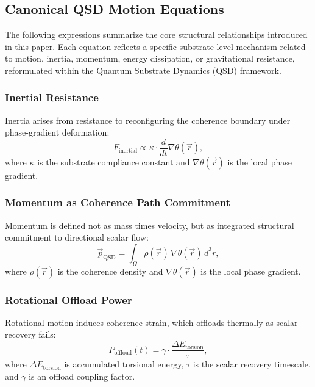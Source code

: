 \documentclass[entropy,article,submit,pdftex,moreauthors]{Definitions/mdpi}
\begin{document}
\appendixstart
\appendix
\section[\appendixname~\thesection]{}
\subsection[\appendixname~\thesubsection]{Canonical QSD Motion Equations}

The following expressions summarize the core structural relationships introduced in this paper. Each equation reflects a specific substrate-level mechanism related to motion, inertia, momentum, energy dissipation, or gravitational resistance, reformulated within the Quantum Substrate Dynamics (QSD) framework.

\subsubsection{Inertial Resistance}
Inertia arises from resistance to reconfiguring the coherence boundary under phase-gradient deformation:
\begin{equation}
    F_{\text{inertial}} \propto \kappa \cdot \frac{d}{dt} \nabla \theta(\vec{r}),
\end{equation}
where \( \kappa \) is the substrate compliance constant and \( \nabla \theta(\vec{r}) \) is the local phase gradient.

\subsubsection{Momentum as Coherence Path Commitment}
Momentum is defined not as mass times velocity, but as integrated structural commitment to directional scalar flow:
\begin{equation}
    \vec{p}_{\text{QSD}} = \int_{\Omega} \rho(\vec{r}) \, \nabla \theta(\vec{r}) \, d^3r,
\end{equation}
where \( \rho(\vec{r}) \) is the coherence density and \( \nabla \theta(\vec{r}) \) is the local phase gradient.

\subsubsection{Rotational Offload Power}
Rotational motion induces coherence strain, which offloads thermally as scalar recovery fails:
\begin{equation}
    P_{\text{offload}}(t) = \gamma \cdot \frac{\Delta E_{\text{torsion}}}{\tau},
\end{equation}
where \( \Delta E_{\text{torsion}} \) is accumulated torsional energy, \( \tau \) is the scalar recovery timescale, and \( \gamma \) is an offload coupling factor.
\end{document}
